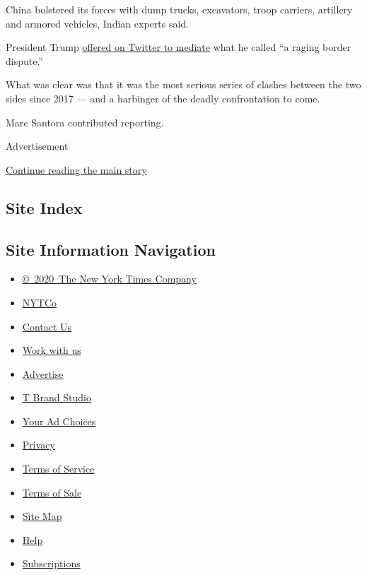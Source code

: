 China bolstered its forces with dump trucks, excavators, troop carriers,
artillery and armored vehicles, Indian experts said.

President Trump
\href{https://twitter.com/realDonaldTrump/status/1265604027678670848}{offered
on Twitter to mediate} what he called ``a raging border dispute.''

What was clear was that it was the most serious series of clashes
between the two sides since 2017 --- and a harbinger of the deadly
confrontation to come.

Marc Santora contributed reporting.

Advertisement

\protect\hyperlink{after-bottom}{Continue reading the main story}

\hypertarget{site-index}{%
\subsection{Site Index}\label{site-index}}

\hypertarget{site-information-navigation}{%
\subsection{Site Information
Navigation}\label{site-information-navigation}}

\begin{itemize}
\tightlist
\item
  \href{https://help.nytimes.com/hc/en-us/articles/115014792127-Copyright-notice}{©~2020~The
  New York Times Company}
\end{itemize}

\begin{itemize}
\tightlist
\item
  \href{https://www.nytco.com/}{NYTCo}
\item
  \href{https://help.nytimes.com/hc/en-us/articles/115015385887-Contact-Us}{Contact
  Us}
\item
  \href{https://www.nytco.com/careers/}{Work with us}
\item
  \href{https://nytmediakit.com/}{Advertise}
\item
  \href{http://www.tbrandstudio.com/}{T Brand Studio}
\item
  \href{https://www.nytimes.com/privacy/cookie-policy\#how-do-i-manage-trackers}{Your
  Ad Choices}
\item
  \href{https://www.nytimes.com/privacy}{Privacy}
\item
  \href{https://help.nytimes.com/hc/en-us/articles/115014893428-Terms-of-service}{Terms
  of Service}
\item
  \href{https://help.nytimes.com/hc/en-us/articles/115014893968-Terms-of-sale}{Terms
  of Sale}
\item
  \href{https://spiderbites.nytimes.com}{Site Map}
\item
  \href{https://help.nytimes.com/hc/en-us}{Help}
\item
  \href{https://www.nytimes.com/subscription?campaignId=37WXW}{Subscriptions}
\end{itemize}
